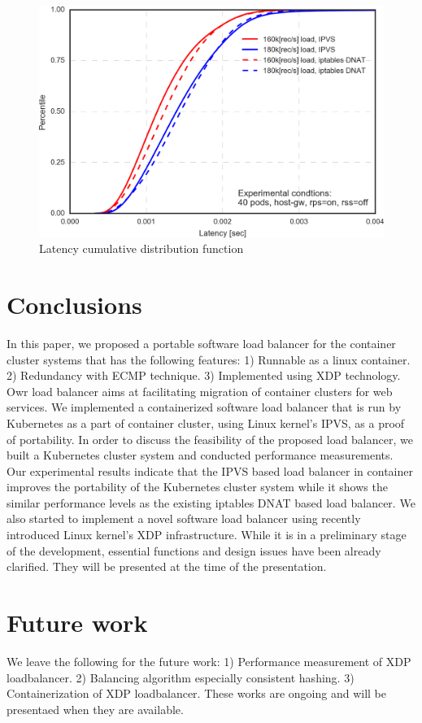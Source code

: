 \begin{figure}
\includegraphics[width=\columnwidth]{Figs/latency_cdf_rps_40pods}
\caption{Latency cumulative distribution function}
\label{fig:latency_cdf_rps_40pods}
\end{figure}



\section{Conclusions}\label{Conclusions}

In this paper, we proposed a portable software load balancer for the container cluster systems that has the following features:
1) Runnable as a linux container.
2) Redundancy with ECMP technique.
3) Implemented using XDP technology.
Owr load balancer aims at facilitating migration of container clusters for web services.
We implemented a containerized software load balancer that is run by Kubernetes as a part of container cluster, 
using Linux kernel's IPVS, as a proof of portability.
In order to discuss the feasibility of the proposed load balancer, we built 
a Kubernetes cluster system and conducted performance measurements.
Our experimental results indicate that the IPVS based load balancer in container improves the portability of 
the Kubernetes cluster system while it shows the similar performance levels as the existing iptables DNAT based load balancer.
%
We also started to implement a novel software load balancer using recently introduced Linux kernel's XDP infrastructure.
While it is in a preliminary stage of the development, essential functions and design issues have been already clarified.
They will be presented at the time of the presentation.

\section{Future work}\label{Future work}

We leave the following for the future work:
1) Performance measurement of XDP loadbalancer.
2) Balancing algorithm especially consistent hashing.
3) Containerization of XDP loadbalancer.
These works are ongoing and will be presentaed when they are available.

